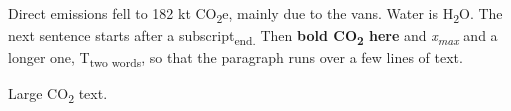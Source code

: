 \documentclass{article}
\begin{document}
Direct emissions fell to 182 kt CO\textsubscript{2}e, mainly due to the vans. Water is
H\textsubscript{2}O. The next sentence starts after a subscript\textsubscript{end.} Then
\textbf{bold CO\textsubscript{2} here} and \emph{x\textsubscript{max}} and a longer one,
T\textsubscript{two words}, so that the paragraph runs over a few lines of text.

{\large Large CO\textsubscript{2} text.\par}
\end{document}
